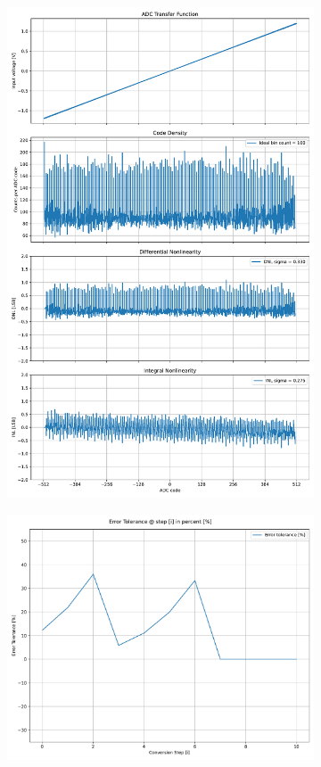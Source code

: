 \documentclass[varwidth]{standalone}
\begin{document}
\begin{figure}
\begin{subfigure}{0.32\textwidth}
    \includegraphics[width=\textwidth]{behavioral_10b_noisy_bincomp_nonlinearity.pdf}
\end{subfigure}
\begin{subfigure}{0.32\textwidth}
    \includegraphics[width=\textwidth]{behavioral_10b_noisy_bincomp_redundancy.pdf}

\end{subfigure}
\end{figure}
\end{document}

